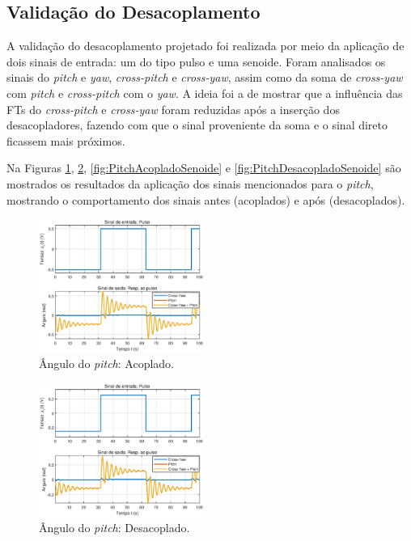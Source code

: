 \subsection{\textbf{Validação do Desacoplamento}}

A validação do desacoplamento projetado foi realizada por meio da aplicação de dois sinais de entrada: um do tipo pulso e uma senoide. Foram analisados os sinais do \textit{pitch} e \textit{yaw}, \textit{cross-pitch} e \textit{cross-yaw}, assim como da soma de \textit{cross-yaw} com \textit{pitch} e \textit{cross-pitch} com o \textit{yaw}. A ideia foi a de mostrar que a influência das FTs do \textit{cross-pitch} e \textit{cross-yaw} foram reduzidas após a inserção dos desacopladores, fazendo com que o sinal proveniente da soma e o sinal direto ficassem mais próximos.


Na Figuras \ref{fig:PitchAcopladoPulso}, \ref{fig:PitchDesacopladoPulso}, \ref{fig:PitchAcopladoSenoide} e \ref{fig:PitchDesacopladoSenoide} são mostrados os resultados da aplicação dos sinais mencionados para o \textit{pitch}, mostrando o comportamento dos sinais antes (acoplados) e após (desacoplados).

\begin{figure}[H]
    \centering
    \includegraphics[width=0.48\textwidth]{figures/Desacoplamento/Pitch_Acoplado_Pulso.eps}
    \caption{Ângulo do \textit{pitch}: Acoplado.}
    \label{fig:PitchAcopladoPulso}
\end{figure}

\begin{figure}[H]
    \centering
    \includegraphics[width=0.48\textwidth]{figures/Desacoplamento/Pitch_Desacoplado_Pulso.eps}
    \caption{Ângulo do \textit{pitch}: Desacoplado.}
    \label{fig:PitchDesacopladoPulso}
\end{figure}

